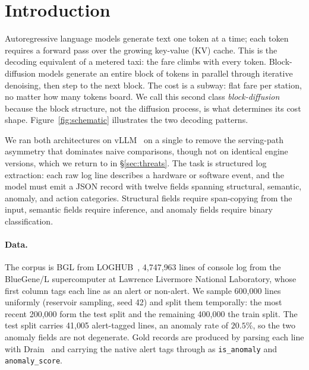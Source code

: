 \section{Introduction}
\label{sec:intro}

Autoregressive language models generate text one token at a time;
each token requires a forward pass over the growing key-value (KV)
cache. This is the decoding equivalent of a metered taxi: the fare
climbs with every token. Block-diffusion models generate an entire
block of tokens in
parallel through iterative denoising, then step to the next block.
The cost is a subway: flat fare per station, no matter how many
tokens board. We call this second class \emph{block-diffusion} because
the block structure, not the diffusion process, is what
determines its cost shape. Figure~\ref{fig:schematic} illustrates
the two decoding patterns.

We ran both architectures on vLLM~\cite{vllm2023} on a single
\gpuModel{} to remove the serving-path asymmetry that dominates naive
comparisons, though not on identical engine versions, which we
return to in \S\ref{sec:threats}. The task is structured log
extraction: each raw log line describes a hardware or software event,
and the model must emit a JSON record with twelve fields spanning
structural, semantic, anomaly, and action categories. Structural
fields require span-copying from the input, semantic fields require
inference, and anomaly fields require binary classification.

\paragraph{Data.}

The corpus is BGL from LOGHUB~\cite{loghub}, 4{,}747{,}963 lines of
console log from the BlueGene/L supercomputer at Lawrence Livermore
National Laboratory, whose first column tags each line as an alert or
non-alert. We sample 600{,}000 lines uniformly (reservoir sampling,
seed 42) and split them temporally: the most recent 200{,}000 form the
test split and the remaining 400{,}000 the train split. The test split
carries 41{,}005 alert-tagged lines, an anomaly rate of $20.5\%$, so
the two anomaly fields are not degenerate. Gold records are produced
by parsing each line with Drain~\cite{drain} and carrying the native
alert tags through as \texttt{is\_anomaly} and \texttt{anomaly\_score}.

